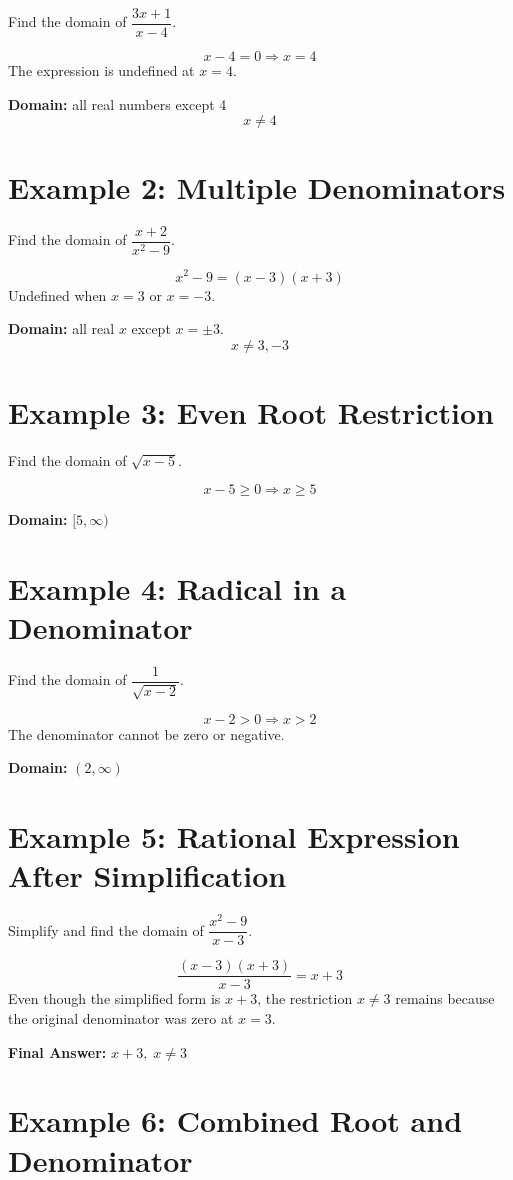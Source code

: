 \documentclass[12pt]{article}
\begin{document}
Find the domain of \(\dfrac{3x + 1}{x - 4}\).

\[
x - 4 = 0 \Rightarrow x = 4
\]
The expression is undefined at \(x = 4\).

\textbf{Domain:} all real numbers except 4  
\[
\boxed{x \ne 4}
\]

\section*{Example 2: Multiple Denominators}

Find the domain of \(\dfrac{x + 2}{x^2 - 9}\).

\[
x^2 - 9 = (x - 3)(x + 3)
\]
Undefined when \(x = 3\) or \(x = -3\).

\textbf{Domain:} all real \(x\) except \(x = \pm 3\).  
\[
\boxed{x \ne 3, -3}
\]

\section*{Example 3: Even Root Restriction}

Find the domain of \(\sqrt{x - 5}\).

\[
x - 5 \ge 0 \Rightarrow x \ge 5
\]

\textbf{Domain:} \([5, \infty)\)

\section*{Example 4: Radical in a Denominator}

Find the domain of \(\dfrac{1}{\sqrt{x - 2}}\).

\[
x - 2 > 0 \Rightarrow x > 2
\]
The denominator cannot be zero or negative.

\textbf{Domain:} \((2, \infty)\)

\section*{Example 5: Rational Expression After Simplification}

Simplify and find the domain of \(\dfrac{x^2 - 9}{x - 3}\).

\[
\dfrac{(x - 3)(x + 3)}{x - 3} = x + 3
\]
Even though the simplified form is \(x + 3\), the restriction \(x \ne 3\) remains because the original denominator was zero at \(x = 3\).

\textbf{Final Answer:} \(\boxed{x + 3, \; x \ne 3}\)

\section*{Example 6: Combined Root and Denominator}
\end{document}
